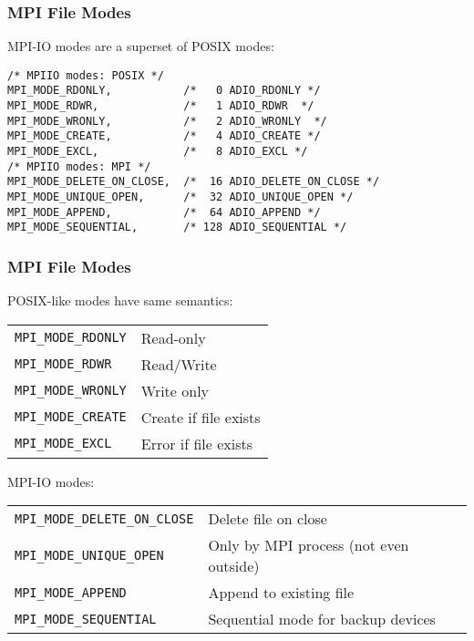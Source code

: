 \begin{frame}[fragile]
\frametitle{MPI File Modes}

MPI-IO modes are a superset of POSIX modes:
{\small
\begin{lstlisting}[style=c]
/* MPIIO modes: POSIX */
MPI_MODE_RDONLY,           /*   0 ADIO_RDONLY */
MPI_MODE_RDWR,             /*   1 ADIO_RDWR  */
MPI_MODE_WRONLY,           /*   2 ADIO_WRONLY  */
MPI_MODE_CREATE,           /*   4 ADIO_CREATE */
MPI_MODE_EXCL,             /*   8 ADIO_EXCL */
/* MPIIO modes: MPI */
MPI_MODE_DELETE_ON_CLOSE,  /*  16 ADIO_DELETE_ON_CLOSE */
MPI_MODE_UNIQUE_OPEN,      /*  32 ADIO_UNIQUE_OPEN */
MPI_MODE_APPEND,           /*  64 ADIO_APPEND */
MPI_MODE_SEQUENTIAL,       /* 128 ADIO_SEQUENTIAL */
\end{lstlisting}
}
\end{frame}

\begin{frame}[fragile]
\frametitle{MPI File Modes}

POSIX-like modes have same semantics:\\[2ex]
\begin{center}
\begin{tabular}{ll}
\hline
\texttt{MPI\_MODE\_RDONLY} & Read-only\\
\texttt{MPI\_MODE\_RDWR}   & Read/Write\\
\texttt{MPI\_MODE\_WRONLY} & Write only\\
\texttt{MPI\_MODE\_CREATE} & Create if file exists\\
\texttt{MPI\_MODE\_EXCL}   & Error if file exists\\
\hline
\end{tabular}
\end{center}

MPI-IO modes:\\[2ex]
\begin{tabular}{ll}
\hline
\texttt{MPI\_MODE\_DELETE\_ON\_CLOSE} & Delete file on close\\
\texttt{MPI\_MODE\_UNIQUE\_OPEN}      & Only by MPI process (not even outside)\\
\texttt{MPI\_MODE\_APPEND}            & Append to existing file\\
\texttt{MPI\_MODE\_SEQUENTIAL}        & Sequential mode for backup devices\\
\hline
\end{tabular}

\end{frame}

